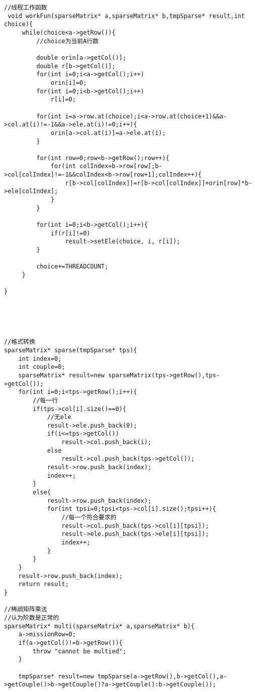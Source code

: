 \begin{lstlisting}
//线程工作函数
 void workFun(sparseMatrix* a,sparseMatrix* b,tmpSparse* result,int choice){
     while(choice<a->getRow()){
         //choice为当前A行数
         
         double orin[a->getCol()];
         double r[b->getCol()];
         for(int i=0;i<a->getCol();i++)
             orin[i]=0;
         for(int i=0;i<b->getCol();i++)
             r[i]=0;
         
         for(int i=a->row.at(choice);i<a->row.at(choice+1)&&a->col.at(i)!=-1&&a->ele.at(i)!=0;i++){
             orin[a->col.at(i)]=a->ele.at(i);
         }
         
         for(int row=0;row<b->getRow();row++){
             for(int colIndex=b->row[row];b->col[colIndex]!=-1&&colIndex<b->row[row+1];colIndex++){
                 r[b->col[colIndex]]=r[b->col[colIndex]]+orin[row]*b->ele[colIndex];
             }
         }
         
         for(int i=0;i<b->getCol();i++){
             if(r[i]!=0)
                 result->setEle(choice, i, r[i]);
         }
         
         choice+=THREADCOUNT;
     }
     
}





//格式转换
sparseMatrix* sparse(tmpSparse* tps){
    int index=0;
    int couple=0;
    sparseMatrix* result=new sparseMatrix(tps->getRow(),tps->getCol());
    for(int i=0;i<tps->getRow();i++){
        //每一行
        if(tps->col[i].size()==0){
            //无ele
            result->ele.push_back(0);
            if(i<=tps->getCol())
                result->col.push_back(i);
            else
                result->col.push_back(tps->getCol());
            result->row.push_back(index);
            index++;
        }
        else{
            result->row.push_back(index);
            for(int tpsi=0;tpsi<tps->col[i].size();tpsi++){
                //每一个符合要求的
                result->col.push_back(tps->col[i][tpsi]);
                result->ele.push_back(tps->ele[i][tpsi]);
                index++;
            }
        }
    }
    result->row.push_back(index);
    return result;
}

//稀疏矩阵乘法
//认为阶数是正常的
sparseMatrix* multi(sparseMatrix* a,sparseMatrix* b){
    a->missionRow=0;
    if(a->getCol()!=b->getRow()){
        throw "cannot be multied";
    }
    
    tmpSparse* result=new tmpSparse(a->getRow(),b->getCol(),a->getCouple()>b->getCouple()?a->getCouple():b->getCouple());
    

\end{lstlisting}

